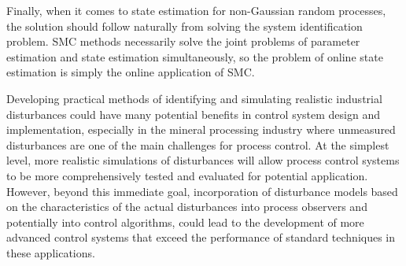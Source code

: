 Finally, when it comes to state estimation for non-Gaussian random processes, the solution should follow naturally from solving the system identification problem. \gls{SMC} methods necessarily solve the joint problems of parameter estimation and state estimation simultaneously, so the problem of online state estimation is simply the online application of \gls{SMC}.

Developing practical methods of identifying and simulating realistic industrial disturbances could have many potential benefits in control system design and implementation, especially in the mineral processing industry where unmeasured disturbances are one of the main challenges for process control. At the simplest level, more realistic simulations of disturbances will allow process control systems to be more comprehensively tested and evaluated for potential application. However, beyond this immediate goal, incorporation of disturbance models based on the characteristics of the actual disturbances into process observers and potentially into control algorithms, could lead to the development of more advanced control systems that exceed the performance of standard techniques in these applications.
